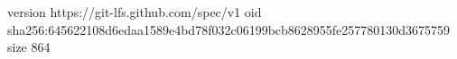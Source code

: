 version https://git-lfs.github.com/spec/v1
oid sha256:645622108d6edaa1589e4bd78f032c06199bcb8628955fe257780130d3675759
size 864
